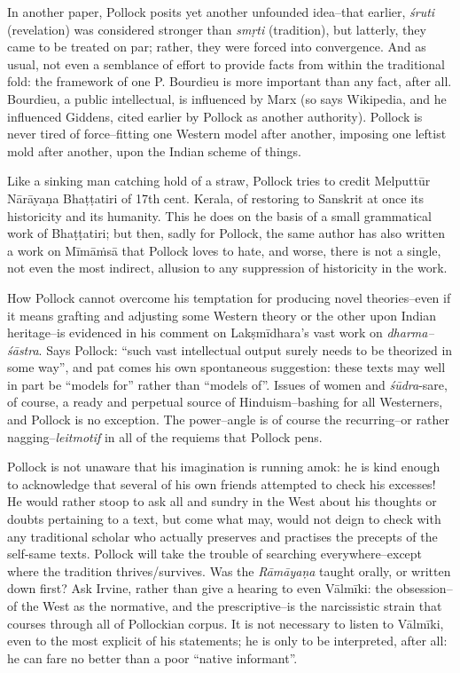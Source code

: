 In another paper, Pollock posits yet another unfounded idea–that earlier, \textit{śruti} (revelation) was considered stronger than \textit{smṛti} (tradition), but latterly, they came to be treated on par; rather, they were forced into convergence. And as usual, not even a semblance of effort to provide facts from within the traditional fold: the framework of one P. Bourdieu is more important than any fact, after all. Bourdieu, a public intellectual, is influenced by Marx (so says Wikipedia, and he influenced Giddens, cited earlier by Pollock as another authority). Pollock is never tired of force–fitting one Western model after another, imposing one leftist mold after another, upon the Indian scheme of things.

Like a sinking man catching hold of a straw, Pollock tries to credit Melputtūr Nārāyaṇa Bhaṭṭatiri of 17th cent. Kerala, of restoring to Sanskrit at once its historicity and its humanity. This he does on the basis of a small grammatical work of Bhaṭṭatiri; but then, sadly for Pollock, the same author has also written a work on Mīmāṁsā that Pollock loves to hate, and worse, there is not a single, not even the most indirect, allusion to any suppression of historicity in the work.

How Pollock cannot overcome his temptation for producing novel theories–even if it means grafting and adjusting some Western theory or the other upon Indian heritage–is evidenced in his comment on Lakṣmīdhara’s vast work on \textit{dharma–śāstra}. Says Pollock: “such vast intellectual output surely needs to be theorized in some way”, and pat comes his own spontaneous suggestion: these texts may well in part be “models for” rather than “models of”. Issues of women and \textit{śūdra}-s\break are, of course, a ready and perpetual source of Hinduism–bashing for all Westerners, and Pollock is no exception. The power–angle is of course the recurring–or rather nagging–\textit{leitmotif} in all of the requiems that Pollock pens.

Pollock is not unaware that his imagination is running amok: he is kind enough to acknowledge that several of his own friends attempted to check his excesses! He would rather stoop to ask all and sundry in the West about his thoughts or doubts pertaining to a text, but come what may, would not deign to check with any traditional scholar who actually preserves and practises the precepts of the self-same texts. Pollock will take the trouble of searching everywhere–except where the tradition thrives/survives. Was the \textit{Rāmāyaṇa} taught orally, or written down first? Ask Irvine, rather than give a hearing to even Vālmīki: the obsession–of the West as the normative, and the prescriptive–is the narcissistic strain that courses through all of Pollockian corpus. It is not necessary to listen to Vālmīki, even to the most explicit of his statements; he is only to be interpreted, after all: he can fare no better than a poor “native informant”.

